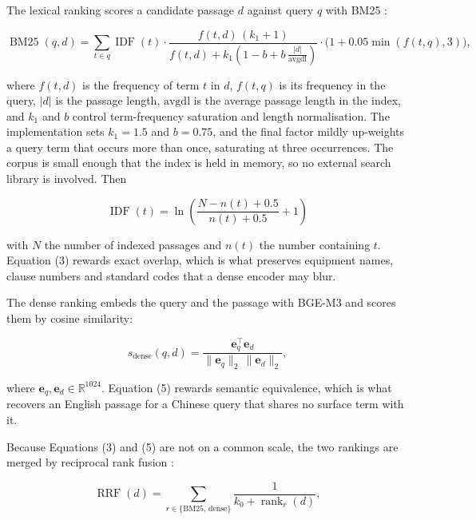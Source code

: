 \documentclass{article}
\DeclareMathOperator{\rank}{rank}
\begin{document}
The lexical ranking scores a candidate passage $d$ against query $q$ with BM25 \citep{robertson2009bm25}:

\begin{equation}
\operatorname{BM25}(q,d)=\sum_{t\in q}\operatorname{IDF}(t)\cdot
\frac{f(t,d)\,(k_1+1)}{f(t,d)+k_1\left(1-b+b\,\frac{|d|}{\mathrm{avgdl}}\right)}
\cdot\bigl(1+0.05\min\!\left(f(t,q),3\right)\bigr),
\end{equation}

where $f(t,d)$ is the frequency of term $t$ in $d$, $f(t,q)$ is its frequency in the query, $|d|$ is the passage length, $\mathrm{avgdl}$ is the average passage length in the index, and $k_1$ and $b$ control term-frequency saturation and length normalisation. The implementation sets $k_1=1.5$ and $b=0.75$, and the final factor mildly up-weights a query term that occurs more than once, saturating at three occurrences. The corpus is small enough that the index is held in memory, so no external search library is involved. Then

\begin{equation}
\operatorname{IDF}(t)=\ln\!\left(\frac{N-n(t)+0.5}{n(t)+0.5}+1\right)
\end{equation}

with $N$ the number of indexed passages and $n(t)$ the number containing $t$. Equation (3) rewards exact overlap, which is what preserves equipment names, clause numbers and standard codes that a dense encoder may blur.

The dense ranking embeds the query and the passage with BGE-M3 \citep{chen2024bgem3} and scores them by cosine similarity:

\begin{equation}
s_{\mathrm{dense}}(q,d)=\frac{\mathbf{e}_q^{\top}\mathbf{e}_d}{\lVert\mathbf{e}_q\rVert_2\,\lVert\mathbf{e}_d\rVert_2},
\end{equation}

where $\mathbf{e}_q,\mathbf{e}_d\in\mathbb{R}^{1024}$. Equation (5) rewards semantic equivalence, which is what recovers an English passage for a Chinese query that shares no surface term with it.

Because Equations (3) and (5) are not on a common scale, the two rankings are merged by reciprocal rank fusion \citep{cormack2009rrf}:

\begin{equation}
\operatorname{RRF}(d)=\sum_{r\in\{\mathrm{BM25},\,\mathrm{dense}\}}\frac{1}{k_0+\rank_r(d)},
\end{equation}
\end{document}
